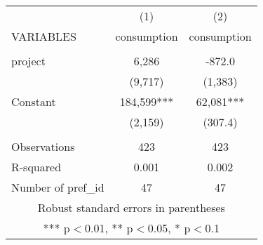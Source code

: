 \documentclass[]{article}
\begin{document}
\begin{tabular}{lcc} \hline
 & (1) & (2) \\
VARIABLES & consumption & consumption \\ \hline
 &  &  \\
project & 6,286 & -872.0 \\
 & (9,717) & (1,383) \\
Constant & 184,599*** & 62,081*** \\
 & (2,159) & (307.4) \\
 &  &  \\
Observations & 423 & 423 \\
R-squared & 0.001 & 0.002 \\
 Number of pref\_id & 47 & 47 \\ \hline
\multicolumn{3}{c}{ Robust standard errors in parentheses} \\
\multicolumn{3}{c}{ *** p$<$0.01, ** p$<$0.05, * p$<$0.1} \\
\end{tabular}
\end{document}
